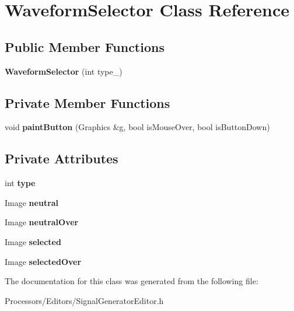 \hypertarget{classWaveformSelector}{\section{Waveform\-Selector Class Reference}
\label{classWaveformSelector}
}
\subsection*{Public Member Functions}
\begin{DoxyCompactItemize}
\item 
\hypertarget{classWaveformSelector_a8dd23f58ec9ec1e6d3030f4c28d8f6e4}{{\bfseries Waveform\-Selector} (int type\-\_\-)}\label{classWaveformSelector_a8dd23f58ec9ec1e6d3030f4c28d8f6e4}

\end{DoxyCompactItemize}
\subsection*{Private Member Functions}
\begin{DoxyCompactItemize}
\item 
\hypertarget{classWaveformSelector_acf4b6f9652840b65cbc8953ed2b8ef7a}{void {\bfseries paint\-Button} (Graphics \&g, bool is\-Mouse\-Over, bool is\-Button\-Down)}\label{classWaveformSelector_acf4b6f9652840b65cbc8953ed2b8ef7a}

\end{DoxyCompactItemize}
\subsection*{Private Attributes}
\begin{DoxyCompactItemize}
\item 
\hypertarget{classWaveformSelector_ac828bb6e30456480ae5ab92fe57d8946}{int {\bfseries type}}\label{classWaveformSelector_ac828bb6e30456480ae5ab92fe57d8946}

\item 
\hypertarget{classWaveformSelector_aa803c3c12878b8e364187e210921e082}{Image {\bfseries neutral}}\label{classWaveformSelector_aa803c3c12878b8e364187e210921e082}

\item 
\hypertarget{classWaveformSelector_a5f660ceb49563f4dba7530ee269ec120}{Image {\bfseries neutral\-Over}}\label{classWaveformSelector_a5f660ceb49563f4dba7530ee269ec120}

\item 
\hypertarget{classWaveformSelector_abfc2cf4873c6d6fe367802fd10389e01}{Image {\bfseries selected}}\label{classWaveformSelector_abfc2cf4873c6d6fe367802fd10389e01}

\item 
\hypertarget{classWaveformSelector_a942f1ecd144807b5699dc8124d5e82aa}{Image {\bfseries selected\-Over}}\label{classWaveformSelector_a942f1ecd144807b5699dc8124d5e82aa}

\end{DoxyCompactItemize}


The documentation for this class was generated from the following file\-:\begin{DoxyCompactItemize}
\item 
Processors/\-Editors/Signal\-Generator\-Editor.\-h\end{DoxyCompactItemize}
